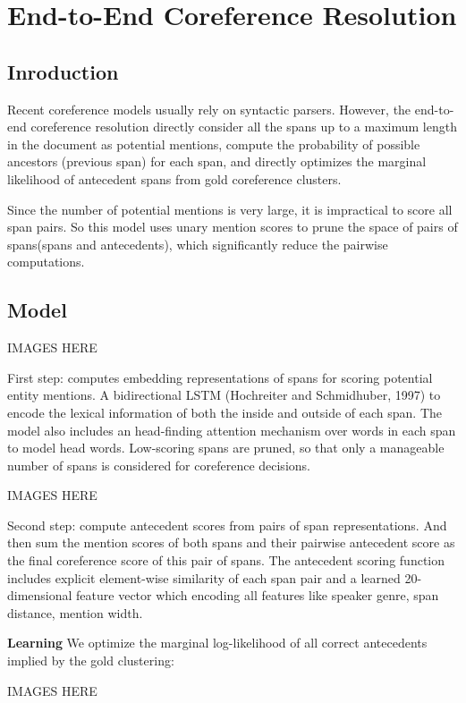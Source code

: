 \documentclass[11pt]{article}
\begin{document}
\section{End-to-End Coreference Resolution}

\subsection{Inroduction}
Recent coreference models usually rely on syntactic parsers. However, the end-to-end coreference resolution directly consider all the spans up to a maximum length in the document as potential mentions,  compute the probability of possible ancestors (previous span) for each span, and directly optimizes the marginal likelihood of antecedent spans from gold coreference clusters.

Since the number of potential mentions is very large, it is impractical to score all span pairs. So this model uses unary mention scores to prune the space of pairs of spans(spans and antecedents), which significantly reduce the pairwise computations.

\subsection{Model}

IMAGES HERE

First step:  computes embedding representations of spans for scoring potential entity mentions.
A  bidirectional LSTM (Hochreiter and Schmidhuber, 1997) to encode the lexical information of both the inside and outside of each span. The model also includes an head-finding attention mechanism over words in each span to model head words.
Low-scoring spans are pruned, so that only a manageable number of spans is considered for coreference decisions.

IMAGES HERE

Second step: compute antecedent scores from pairs of span representations. And then sum the mention scores of both spans and their pairwise antecedent score as the final coreference score of this pair of spans.
The antecedent scoring function includes explicit element-wise similarity of each span pair and a learned 20-dimensional feature vector which encoding all features like speaker genre, span distance, mention width.

{\bf Learning} We optimize the marginal log-likelihood of all correct antecedents implied by the gold clustering:

IMAGES HERE
\end{document}
